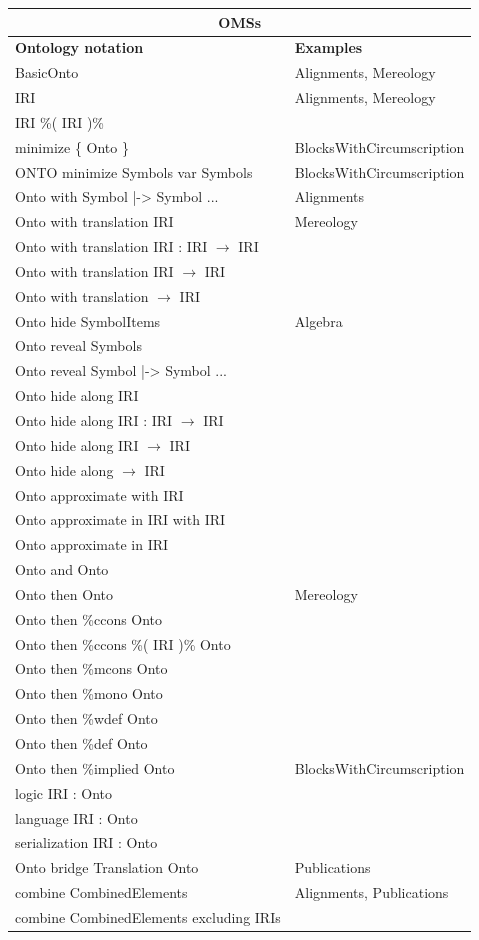 \documentclass[10pt,%
\ifpretendfinal
final%
\else
draft%
\fi,
]{scrreprt}
\begin{document}
\begin{tabular}{|l|l|}\hline
\multicolumn{2}{|c|}{\textbf{OMSs}}\\\hline
\textbf{Ontology notation} & \textbf{Examples} \\\hline
BasicOnto  & Alignments, Mereology \\\hline
IRI  & Alignments, Mereology \\\hline
IRI \%( IRI )\%  &  \\\hline
minimize \{ Onto \}  & BlocksWithCircumscription \\\hline
ONTO minimize Symbols var Symbols  & BlocksWithCircumscription \\\hline
Onto with Symbol |-> Symbol ...  & Alignments \\\hline
Onto with translation IRI  & Mereology \\\hline
Onto with translation IRI : IRI $\to$ IRI  &  \\\hline
Onto with translation IRI $\to$ IRI  &  \\\hline
Onto with translation $\to$ IRI  &  \\\hline
Onto hide SymbolItems  &  Algebra \\\hline
Onto reveal Symbols  &  \\\hline
Onto reveal Symbol |-> Symbol ...  &  \\\hline
Onto hide along IRI  &  \\\hline
Onto hide along IRI : IRI $\to$ IRI  &  \\\hline
Onto hide along IRI $\to$ IRI  &  \\\hline
Onto hide along $\to$ IRI  &  \\\hline
Onto approximate with IRI   &  \\\hline
Onto approximate in IRI with IRI   &  \\\hline
Onto approximate in IRI  &  \\\hline
Onto and Onto   &  \\\hline
Onto then Onto  & Mereology \\\hline
Onto then \%ccons Onto  &  \\\hline
Onto then \%ccons \%( IRI )\% Onto  &  \\\hline
Onto then \%mcons Onto  &  \\\hline
Onto then \%mono Onto  &  \\\hline
Onto then \%wdef Onto  &  \\\hline
Onto then \%def Onto  &  \\\hline
Onto then \%implied Onto  &  BlocksWithCircumscription \\\hline
logic IRI : Onto  &  \\\hline
language IRI : Onto  &  \\\hline
serialization IRI : Onto  &  \\\hline
Onto bridge Translation Onto  & Publications \\\hline
combine CombinedElements  & Alignments, Publications \\\hline
combine CombinedElements excluding IRIs  &  \\\hline
\end{tabular}
\end{document}

